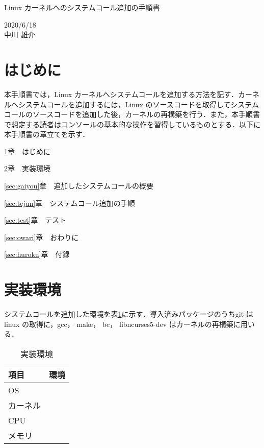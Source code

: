 \documentclass[12pt]{jsarticle}
\begin{document}
\begin{center}
{\LARGE Linux カーネルへのシステムコール追加の手順書}
\end{center}

\begin{flushright}
  2020/6/18\\
  中川 雄介
\end{flushright}
\section{はじめに}\label{sec:hajime}
\label{sec:introduction}
本手順書では，Linux カーネルへシステムコールを追加する方法を記す．カーネルへシステムコールを追加するには，Linux のソースコードを取得してシステムコールのソースコードを追加した後，カーネルの再構築を行う．また，本手順書で想定する読者はコンソールの基本的な操作を習得しているものとする．以下に本手順書の章立てを示す．

\ref{sec:hajime}章　はじめに

\ref{sec:env}章　実装環境

\ref{sec:gaiyou}章　追加したシステムコールの概要

\ref{sec:tejun}章　システムコール追加の手順

\ref{sec:test}章　テスト

\ref{sec:owari}章　おわりに

\ref{sec:huroku}章　付録

\section{実装環境}\label{sec:env}

システムコールを追加した環境を表\ref{tab:1}に示す．導入済みパッケージのうちgit はlinux の取得に，gcc， make， bc， libncurses5-dev はカーネルの再構築に用いる．
\begin{table}[h]
  \begin{center}
    \caption{実装環境}\label{tab:1}
    \begin{tabular}{l|l}
      \hline\hline
      \multicolumn{1}{l|}{項目} & \multicolumn{1}{l}{環境}\\
      \hline
      OS &  \\
      カーネル & \\
      CPU & \\
      メモリ & \\
      \hline
    \end{tabular}
  \end{center}
\end{table}
\end{document}
